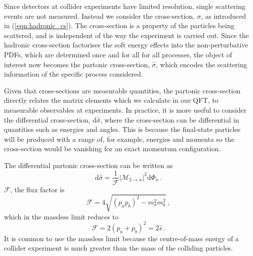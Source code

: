 \documentclass[main.tex]{subfiles}
\begin{document}
    Since detectors at collider experiments
    have limited resolution, single scattering
    events are not measured. Instead we consider
    the cross-section, $\sigma$, as introduced in
    (\ref{eqn:hadronic_cs}). The cross-section is a property
    of the particles being scattered, and is independent
    of the way the experiment is carried out.
    Since the hadronic cross-section factorises
    the soft energy effects into the non-perturbative PDFs,
    which are determined once and for all for all
    processes, the object of interest now becomes the
    partonic cross-section, $\hat{\sigma}$, which
    encodes the scattering information of the specific
    process considered.

    Given that cross-sections are measurable
    quantities, the partonic cross-section directly
    relates the matrix elements which we calculate in our QFT,
    to measurable observables at experiments.
    In practice, it is more useful to consider the
    differential cross-section, $\mathrm{d}\hat{\sigma}$,
    where the cross-section can be differential
    in quantities such as energies and angles.
    This is because the final-state particles
    will be produced with a range of, for example,
    energies and momenta so the cross-section would
    be vanishing for an exact momentum configuration.

    The differential partonic cross-section can be written as
    \begin{equation}\label{eqn:dsigma}
        \mathrm{d}\hat{\sigma} = \dfrac{1}{\mathcal{F}}|\mathcal{M}_{2 \rightarrow n}|^{2} \mathrm{d}\Phi_{n} \, .
    \end{equation}
    $\mathcal{F}$, the flux factor is
    \begin{equation}\label{eqn:flux}
        \mathcal{F} = 4\sqrt{(p_{a}p_{b})^{2} - m_{a}^{2}m_{b}^{2}} \, ,
    \end{equation}
    which in the massless limit reduces to
    \begin{equation}\label{eqn:massless_flux}
        \mathcal{F} = 2(p_{a} + p_{b})^{2} = 2\hat{s} \, .
    \end{equation}
    It is common to use the massless limit because
    the centre-of-mass energy of a collider
    experiment is much greater than the mass
    of the colliding particles.
\end{document}
